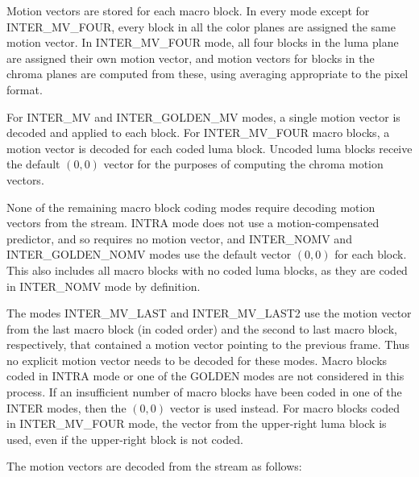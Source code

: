 \documentclass[9pt,letterpaper]{book}
\numberwithin{equation}{chapter}
\numberwithin{figure}{chapter}
\numberwithin{table}{chapter}
\begin{document}
Motion vectors are stored for each macro block.
In every mode except for INTER\_MV\_FOUR, every block in all the color planes
 are assigned the same motion vector.
In INTER\_MV\_FOUR mode, all four blocks in the luma plane are assigned their
 own motion vector, and motion vectors for blocks in the chroma planes are
 computed from these, using averaging appropriate to the pixel format.

For INTER\_MV and INTER\_GOLDEN\_MV modes, a single motion vector is decoded
 and applied to each block.
For INTER\_MV\_FOUR macro blocks, a motion vector is decoded for each coded
 luma block.
Uncoded luma blocks receive the default $(0,0)$ vector for the purposes of
 computing the chroma motion vectors.

None of the remaining macro block coding modes require decoding motion vectors
 from the stream.
INTRA mode does not use a motion-compensated predictor, and so requires no
 motion vector, and INTER\_NOMV and INTER\_GOLDEN\_NOMV modes use the default
 vector $(0,0)$ for each block.
This also includes all macro blocks with no coded luma blocks, as they are
 coded in INTER\_NOMV mode by definition.

The modes INTER\_MV\_LAST and INTER\_MV\_LAST2 use the motion vector from the
 last macro block (in coded order) and the second to last macro block,
 respectively, that contained a motion vector pointing to the previous frame.
Thus no explicit motion vector needs to be decoded for these modes.
Macro blocks coded in INTRA mode or one of the GOLDEN modes are not considered
 in this process.
If an insufficient number of macro blocks have been coded in one of the INTER
 modes, then the $(0,0)$ vector is used instead.
For macro blocks coded in INTER\_MV\_FOUR mode, the vector from the upper-right
 luma block is used, even if the upper-right block is not coded.

The motion vectors are decoded from the stream as follows:
\end{document}
